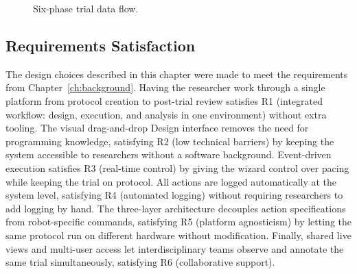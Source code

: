 \begin{figure}[htbp]
\centering
{}
\caption{Six-phase trial data flow.}
\label{fig:trial-dataflow}
\end{figure}

\subsection{Requirements Satisfaction}

The design choices described in this chapter were made to meet the requirements from Chapter~\ref{ch:background}. Having the researcher work through a single platform from protocol creation to post-trial review satisfies R1 (integrated workflow: design, execution, and analysis in one environment) without extra tooling. The visual drag-and-drop Design interface removes the need for programming knowledge, satisfying R2 (low technical barriers) by keeping the system accessible to researchers without a software background. Event-driven execution satisfies R3 (real-time control) by giving the wizard control over pacing while keeping the trial on protocol. All actions are logged automatically at the system level, satisfying R4 (automated logging) without requiring researchers to add logging by hand. The three-layer architecture decouples action specifications from robot-specific commands, satisfying R5 (platform agnosticism) by letting the same protocol run on different hardware without modification. Finally, shared live views and multi-user access let interdisciplinary teams observe and annotate the same trial simultaneously, satisfying R6 (collaborative support).


